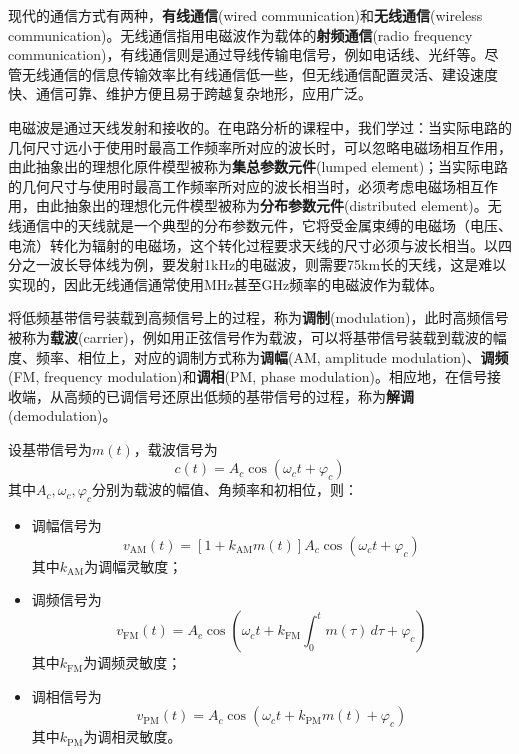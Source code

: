 现代的通信方式有两种\cite{electronic_circuits}，\textbf{有线通信}(wired communication)和\textbf{无线通信}(wireless communication)。无线通信指用电磁波作为载体的\textbf{射频通信}(radio frequency communication)，有线通信则是通过导线传输电信号，例如电话线、光纤等。尽管无线通信的信息传输效率比有线通信低一些，但无线通信配置灵活、建设速度快、通信可靠、维护方便且易于跨越复杂地形，应用广泛。

电磁波是通过天线发射和接收的。在电路分析的课程中，我们学过：当实际电路的几何尺寸远小于使用时最高工作频率所对应的波长时，可以忽略电磁场相互作用，由此抽象出的理想化原件模型被称为\textbf{集总参数元件}(lumped element)；当实际电路的几何尺寸与使用时最高工作频率所对应的波长相当时，必须考虑电磁场相互作用，由此抽象出的理想化元件模型被称为\textbf{分布参数元件}(distributed element)。无线通信中的天线就是一个典型的分布参数元件，它将受金属束缚的电磁场（电压、电流）转化为辐射的电磁场，这个转化过程要求天线的尺寸必须与波长相当。以四分之一波长导体线为例，要发射1kHz的电磁波，则需要75km长的天线，这是难以实现的，因此无线通信通常使用MHz甚至GHz频率的电磁波作为载体。

将低频基带信号装载到高频信号上的过程，称为\textbf{调制}(modulation)，此时高频信号被称为\textbf{载波}(carrier)，例如用正弦信号作为载波，可以将基带信号装载到载波的幅度、频率、相位上，对应的调制方式称为\textbf{调幅}(AM, amplitude modulation)、\textbf{调频}(FM, frequency modulation)和\textbf{调相}(PM, phase modulation)。相应地，在信号接收端，从高频的已调信号还原出低频的基带信号的过程，称为\textbf{解调}(demodulation)。
\begin{definition}[调频、调幅、调相]
    设基带信号为$m(t)$，载波信号为\[c(t)=A_c \cos(\omega_c t+\varphi_c)\]
    其中$A_c,\omega_c,\varphi_c$分别为载波的幅值、角频率和初相位，则：
    \begin{itemize}
        \item 调幅信号为\[v_{\text{AM}}(t)=[1+k_{\text{AM}} m(t)]A_c \cos(\omega_c t+\varphi_c)\]其中$k_{\text{AM}}$为调幅灵敏度；
        \item 调频信号为\[v_{\text{FM}}(t)=A_c \cos\left(\omega_c t+k_{\text{FM}}\int_{0}^{t}m(\tau)\,d\tau+\varphi_c\right)\]其中$k_{\text{FM}}$为调频灵敏度；
        \item 调相信号为\[v_{\text{PM}}(t)=A_c \cos\left(\omega_c t+k_{\text{PM}} m(t)+\varphi_c\right)\]其中$k_{\text{PM}}$为调相灵敏度。
    \end{itemize}
\end{definition}

